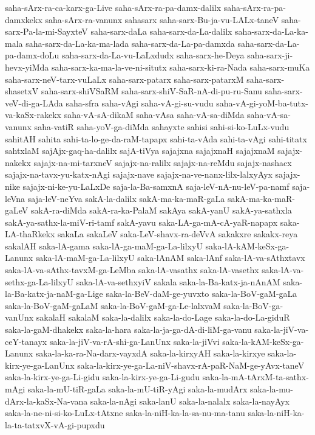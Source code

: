 {saha-sArx-ra-ca-karx-ga-Live
saha-sArx-ra-pa-damx-dalilx
saha-sArx-ra-pa-damxkekx
saha-sArx-ra-vanunx
sahasarx
saha-sarx-Bu-ja-vu-LALx-taneV
saha-sarx-Pa-la-mi-SayxteV
saha-sarx-daLa
saha-sarx-da-La-dalilx
saha-sarx-da-La-ka-mala
saha-sarx-da-La-ka-ma-lada
saha-sarx-da-La-pa-damxda
saha-sarx-da-La-pa-damx-doLu
saha-sarx-da-La-vu-LaLxdudx
saha-sarx-he-Deya
saha-sarx-ji-hevx-yiMda
saha-sarx-ka-ma-la-ve-ni-situtx
saha-sarx-ki-ra-Nada
saha-sarx-muKa
saha-sarx-neV-tarx-vuLaLx
saha-sarx-patarx
saha-sarx-patarxM
saha-sarx-shasetxV
saha-sarx-shiVSaRM
saha-sarx-shiV-SaR-nA-di-pu-ru-Sanu
saha-sarx-veV-di-ga-LAda
saha-sfra
saha-vAgi
saha-vA-gi-su-vudu
saha-vA-gi-yoM-ba-tutx-va-kaSx-rakekx
saha-vA-sA-dikaM
saha-vAsa
saha-vA-sa-diMda
saha-vA-sa-vanunx
saha-vatiR
saha-yoV-ga-diMda
sahayxte
sahisi
sahi-si-ko-LuLx-vudu
sahitAH
sahita
sahi-ta-lo-ge-da-raM-tapapx
sahi-ta-vAda
sahi-ta-vAgi
sahi-titatx
sahtxlaM
sajAjx-gaq-ha-dalilx
sajA-tiVya
sajajxna
sajajxnaH
sajajxnaM
sajajx-nakekx
sajajx-na-mi-tarxneV
sajajx-na-ralilx
sajajx-na-reMdu
sajajx-nashacx
sajajx-na-tavx-yu-katx-nAgi
sajajx-nave
sajajx-na-ve-nanx-lilx-lalxyAyx
sajajx-nike
sajajx-ni-ke-yu-LaLxDe
saja-la-Ba-samxnA
saja-leV-nA-nu-leV-pa-namf
saja-leVna
saja-leV-neYva
sakA-la-dalilx
sakA-ma-ka-maR-gaLa
sakA-ma-ka-maR-gaLeV
sakA-ra-diMda
sakA-ra-ka-PalaM
sakAya
sakA-yanU
sakA-ya-sathxla
sakA-ya-sathx-la-miV-ri-tamf
sakA-yavu
saka-LA-ga-mA-cA-yaR-napapx
saka-LA-thaRkekx
sakaLa
sakaLeV
saka-LeV-shavx-ra-deVvA
sakakxre
sakakx-reya
sakalAH
saka-lA-gama
saka-lA-ga-maM-ga-La-lilxyU
saka-lA-kAM-keSx-ga-Lanunx
saka-lA-maM-ga-La-lilxyU
saka-lAnAM
saka-lAnf
saka-lA-va-sAthxtavx
saka-lA-va-sAthx-tavxM-ga-LeMba
saka-lA-vasathx
saka-lA-vasethx
saka-lA-va-sethx-ga-La-lilxyU
saka-lA-va-sethxyiV
sakala
saka-la-Ba-katx-ja-nAnAM
saka-la-Ba-katx-ja-naM-ga-Lige
saka-la-BeV-daM-ge-yuvxto
saka-la-BoV-gaM-gaLa
saka-la-BoV-gaM-gaLaM
saka-la-BoV-gaM-ga-Le-lalxvaM
saka-la-BoV-ga-vanUnx
sakalaH
sakalaM
saka-la-dalilx
saka-la-do-Lage
saka-la-do-La-giduR
saka-la-gaM-dhakekx
saka-la-hara
saka-la-ja-ga-dA-di-liM-ga-vanu
saka-la-jiV-va-ceY-tanayx
saka-la-jiV-va-rA-shi-ga-LanUnx
saka-la-jiVvi
saka-la-kAM-keSx-ga-Lanunx
saka-la-ka-ra-Na-darx-vayxdA
saka-la-kirxyAH
saka-la-kirxye
saka-la-kirx-ye-ga-LanUnx
saka-la-kirx-ye-ga-La-niV-shavx-rA-paR-NaM-ge-yAvx-taneV
saka-la-kirx-ye-ga-Li-gidu
saka-la-kirx-ye-ga-Li-gudu
saka-la-mA-tArxM-ta-sathx-mAgi
saka-la-mU-tiR-gaLa
saka-la-mU-tiR-yAgi
saka-la-mudArx
saka-la-mu-dArx-la-kaSx-Na-vana
saka-la-nAgi
saka-lanU
saka-la-nalalx
saka-la-nayAyx
saka-la-ne-ni-si-ko-LuLx-tAtxne
saka-la-niH-ka-la-sa-nu-ma-tanu
saka-la-niH-ka-la-ta-tatxvX-vA-gi-pupxdu
}
